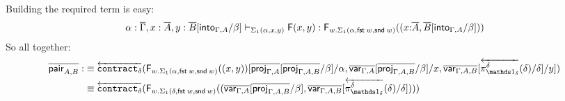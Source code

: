\documentclass[10pt]{article}
\theoremstyle{definition}
\newcommand\dsd[1]{\ensuremath{\mathsf{#1}}}
\newcommand{\yields}{\vdash}
\newcommand{\app}[2]{\ensuremath{#1 \: #2}}
\newcommand{\telety}[3]{\ensuremath{(#1{:}#2,#3)}}
\newcommand{\fst}[1]{\app{\dsd{fst}}{#1}}
\newcommand{\snd}[1]{\app{\dsd{snd}}{#1}}
\newcommand{\rewrite}[2]{\overleftarrow{#1}(#2)}
\newcommand\F[2]{\ensuremath{\mathsf{F}_{#1}(#2)}}
\newcommand\FI[1]{\ensuremath{\mathsf{F}{(#1)}}}
\newcommand\FIs[2]{\ensuremath{\mathsf{F}_{#1}{(#2)}}}
\begin{document}
\begin{enumerate}[style = multiline, labelwidth = 80pt]
Building the required term is easy:
\begin{align*}
\alpha : \upstairs{\Gamma}, x : \upstairs{A}, y : \upstairs{B}[\into{\Gamma,A}/\beta] \yields_{\Sigma_1(\alpha, x, y)} \FI{x, y} : \F{w. \Sigma_1(\alpha,\fst w, \snd w)}{\telety{x}{\upstairs{A}}{\upstairs{B}[\into{\Gamma,A}/\beta]}}
\end{align*}
So all together:
\begin{align*}
\upstairs{\qpair{A,B}} :&\equiv \rewrite{\contract{\delta}}{\FIs{w. \Sigma_1(\alpha,\fst w, \snd w)}{(x, y)}[\upstairs{\proj{\Gamma, A}}[\upstairs{\proj{\Gamma, A, B}}/\beta]/\alpha, \upstairs{\qvar{\Gamma, A}}[\upstairs{\proj{\Gamma, A, B}}/\beta]/x, \upstairs{\qvar{\Gamma, A, B}}[\rewrite{\pi^\delta_{\One_\delta}}{\delta}/\delta]/y]} \\
&\equiv \rewrite{\contract{\delta}}{\FIs{w. \Sigma_1(\delta,\fst w, \snd w)}{(\upstairs{\qvar{\Gamma, A}}[\upstairs{\proj{\Gamma, A, B}}/\beta], \upstairs{\qvar{\Gamma, A, B}}[\rewrite{\pi^\delta_{\One_\delta}}{\delta}/\delta])}}
\end{align*}


\end{enumerate}
\end{document}
